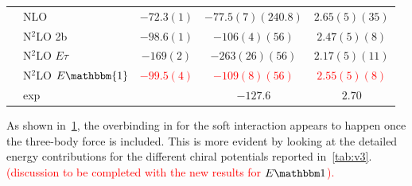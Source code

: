 \documentclass[aps,prc,twocolumn,superscriptaddress,floatfix]{revtex4-1}
\newcommand{\red}[1]{\protect\textcolor{red}{#1}}
\begin{document}
\begin{table}[htb]
\begin{tabular}{llccc}
                                               & NLO                    & $-72.3(1)$   & $-77.5(7)(240.8)$ & $2.65(5)(35)$ \\
                                               & N$^2$LO 2b             & $-98.6(1)$   & $-106(4)(56)$     & $2.47(5)(8)$  \\
   	  	                                       & N$^2$LO $E\tau$        & $-169(2)$    & $-263(26)(56)$    & $2.17(5)(11)$ \\
                                               & N$^2$LO $E\mathbbm{1}$ & \red{$-99.5(4)$} & \red{$-109(8)(56)$} & \red{$2.55(5)(8)$} \\
                                               & exp                    &              & $-127.6$          & $2.70$        \\
\hline\hline
\end{tabular}
\label{tab:12}
\end{table}

As shown in~\cref{tab:12}, the overbinding in  for the soft interaction 
appears to happen once the three-body force is included. This is more evident by looking at the detailed 
energy contributions for the different chiral potentials reported in~\cref{tab:v3}.
\red{(discussion to be completed with the new results for $E\mathbbm1$).}
\end{document}
